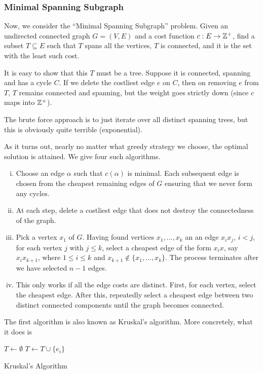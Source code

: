 \subsubsection{Minimal Spanning Subgraph}

Now, we consider the ``Minimal Spanning Subgraph'' problem. Given an undirected connected graph $G=(V,E)$ and a cost function $c:E\to\mathbb{Z}^+$, find a subset $T\subseteq E$ such that $T$ spans all the vertices, $T$ is connected, and it is the set with the least such cost.

It is easy to show that this $T$ must be a tree. Suppose it is connected, spanning and has a cycle $C$. If we delete the costliest edge $e$ on $C$, then on removing $e$ from $T$, $T$ remains connected and spanning, but the weight goes strictly down (since $c$ maps into $\mathbb{Z}^+$).

The brute force approach is to just iterate over all distinct spanning trees, but this is obviously quite terrible (exponential).

As it turns out, nearly no matter what greedy strategy we choose, the optimal solution is attained. We give four such algorithms.
\begin{enumerate}[(i)]
	\item Choose an edge $\alpha$ such that $c(\alpha)$ is minimal. Each subsequent edge is chosen from the cheapest remaining edges of $G$ ensuring that we never form any cycles.
	
	\item At each step, delete a costliest edge that does not destroy the connectedness of the graph.
	
	\item Pick a vertex $x_1$ of $G$. Having found vertices $x_1,\ldots,x_k$ an an edge $x_ix_j$, $i<j$, for each vertex $j$ with $j\leq k$, select a cheapest edge of the form $x_ix$, say $x_i x_{k+1}$, where $1\leq i\leq k$ and $x_{k+1}\not\in\{x_1,\ldots,x_k\}$. The process terminates after we have selected $n-1$ edges.
	
	\item This only works if all the edge costs are distinct. First, for each vertex, select the cheapest edge. After this, repeatedly select a cheapest edge between two distinct connected components until the graph becomes connected.
\end{enumerate}

The first algorithm is also known as Kruskal's algorithm. More concretely, what it does is 

\begin{algorithm}
	\DontPrintSemicolon
	\SetNoFillComment
	 
	$T\gets\emptyset$\;
	 {
		 {
			$T\gets T\cup\{e_i\}$
		}
	}
	\caption{Kruskal's Algorithm}\label{algo: kruskel's algorithm}
\end{algorithm}

